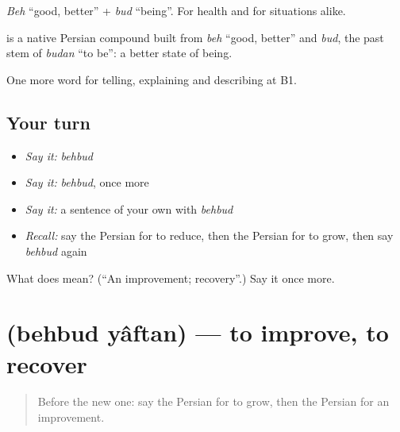 \emph{Beh} \textquotedblleft{}good, better\textquotedblright{} + \emph{bud} \textquotedblleft{}being\textquotedblright{}. For health and for situations alike.

\begin{cousinweb}
\textbf{} is a native Persian compound built from \emph{beh} \textquotedblleft{}good, better\textquotedblright{} and \emph{bud}, the past stem of \emph{budan} \textquotedblleft{}to be\textquotedblright{}: a better state of being.
\end{cousinweb}

\begin{grammarlens}[title={What you've built}]
One more word for telling, explaining and describing at B1.
\end{grammarlens}

\subsection*{Your turn}
\begin{itemize}
\raggedright
  \item \emph{Say it:} \emph{behbud}
  \item \emph{Say it:} \emph{behbud}, once more
  \item \emph{Say it:} a sentence of your own with \emph{behbud}
  \item \emph{Recall:} say the Persian for to reduce, then the Persian for to grow, then say \emph{behbud} again
\end{itemize}

\begin{tcolorbox}[breakable,colback=teal!4,colframe=teal!35!black,title={Before you move on}]
What does  mean? (\textquotedblleft{}An improvement; recovery\textquotedblright{}.) Say it once more.
\end{tcolorbox}
\section[\texorpdfstring{\fa{بهبود} \fa{یافتن} (behbud yâftan)}{بهبود یافتن (behbud yâftan)}]{  (behbud yâftan) — to improve, to recover}

\label{lesson:FA-C374-behbud-yaftan}



\begin{quote}
Before the new one: say the Persian for to grow, then the Persian for an improvement.
\end{quote}


